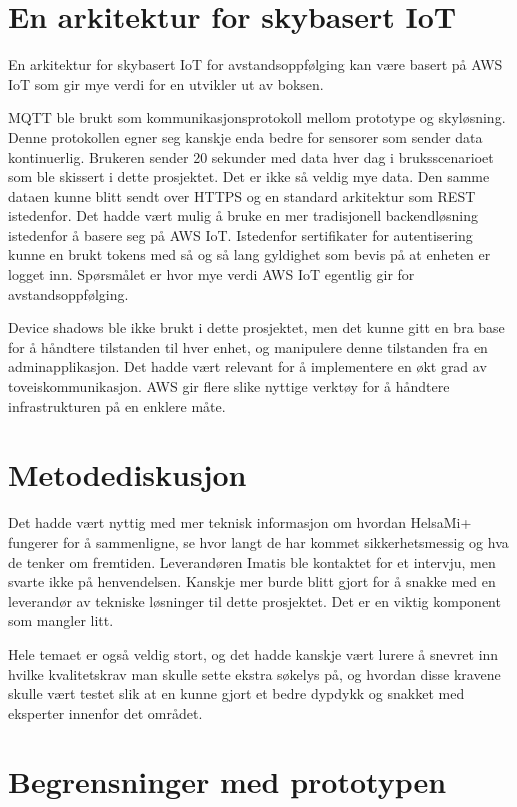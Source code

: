 \section{En arkitektur for skybasert IoT}
En arkitektur for skybasert IoT for avstandsoppfølging kan være basert på AWS IoT som gir mye verdi for en utvikler ut av boksen.

MQTT ble brukt som kommunikasjonsprotokoll mellom prototype og skyløsning. Denne protokollen egner seg kanskje enda bedre for sensorer
som sender data kontinuerlig. Brukeren sender 20 sekunder med data hver dag i bruksscenarioet som ble skissert i dette prosjektet. Det er ikke så veldig
mye data. Den samme dataen kunne blitt sendt over HTTPS og en standard arkitektur som REST istedenfor. Det hadde vært mulig å bruke
en mer tradisjonell backendløsning istedenfor å basere seg på AWS IoT. Istedenfor sertifikater for autentisering
kunne en brukt tokens med så og så lang gyldighet som bevis på at enheten er logget inn. Spørsmålet er hvor mye verdi AWS IoT egentlig gir
for avstandsoppfølging.

Device shadows ble ikke brukt i dette prosjektet, men det kunne gitt en bra base for å håndtere tilstanden til hver enhet, og manipulere denne tilstanden
fra en adminapplikasjon. Det hadde vært relevant for å implementere en økt grad av toveiskommunikasjon. AWS gir flere slike nyttige verktøy for
å håndtere infrastrukturen på en enklere måte.

\section{Metodediskusjon}
Det hadde vært nyttig med mer teknisk informasjon om hvordan HelsaMi+ fungerer for å sammenligne,
se hvor langt de har kommet sikkerhetsmessig og hva de tenker om fremtiden. Leverandøren Imatis ble kontaktet for et
intervju, men svarte ikke på henvendelsen. Kanskje mer burde blitt gjort for å snakke med en leverandør av tekniske løsninger
til dette prosjektet. Det er en viktig komponent som mangler litt.

Hele temaet er også veldig stort, og det hadde kanskje vært
lurere å snevret inn hvilke kvalitetskrav man skulle sette ekstra søkelys på, og hvordan disse kravene
skulle vært testet slik at en kunne gjort et bedre dypdykk
og snakket med eksperter innenfor det området.

\iffalse
\section{Begrensninger med
prototypen}\label{begrensninger-med-prototypen}

